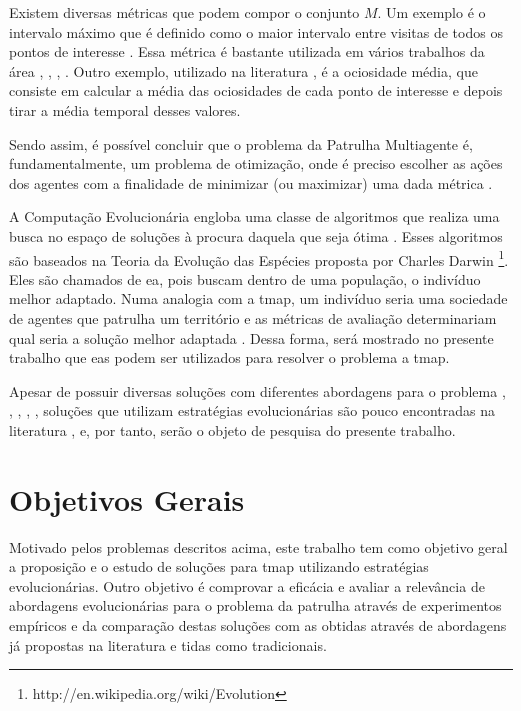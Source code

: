 Existem diversas métricas que podem compor o conjunto $M$. Um exemplo é o 
intervalo máximo que é definido como o maior intervalo entre visitas de todos os 
pontos de interesse \citep{sampaiophd}. Essa métrica é bastante utilizada em 
vários trabalhos da área \citep{6900280}, \cite{Pippin:2013:PBT:2480362.2480378}, 
\citep{Chevaleyre:2004:TAM:1018411.1019013}, \citep{6615158}. Outro exemplo, 
utilizado na literatura \citep{hernandez2013game}, é a ociosidade média, que 
consiste em calcular a média das ociosidades de cada ponto de interesse e depois 
tirar a média temporal desses valores.

Sendo assim, é possível concluir que o problema da Patrulha Multiagente é, 
fundamentalmente, um problema de otimização, onde é preciso escolher as ações 
dos agentes com a finalidade de minimizar (ou maximizar) uma dada métrica 
\citep{sampaiophd}.

A Computação Evolucionária engloba uma classe de algoritmos que realiza uma 
busca no espaço de soluções à procura daquela que seja ótima 
\citep{Luke2013Metaheuristics}. Esses algoritmos são baseados na Teoria da 
Evolução das Espécies proposta por Charles Darwin 
\footnote{http://en.wikipedia.org/wiki/Evolution}. Eles são chamados de \ac{ea}, 
pois buscam dentro de uma população, o indivíduo melhor adaptado. Numa analogia 
com a \ac{tmap}, um indivíduo seria uma sociedade de agentes que patrulha um 
território e as métricas de avaliação determinariam qual seria a solução melhor 
adaptada . Dessa forma, será mostrado no presente trabalho que \acp{ea} podem 
ser utilizados para resolver o problema a \ac{tmap}.

Apesar de possuir diversas soluções com diferentes abordagens para o problema 
\citep{Chevaleyre:2004:TAM:1018411.1019013}, 
\citep{Machado:2002:MPE:1765317.1765332}, \citep{Almeida:2004:AAI}, 
\citep{4209122}, \citep{hernandez2013game}, soluções que utilizam estratégias 
evolucionárias \citep{Luke2013Metaheuristics} são pouco encontradas na 
literatura \citep{4630897}, \citep{6900280} e, por tanto, serão o objeto de 
pesquisa do presente trabalho.

\section{Objetivos Gerais}

Motivado pelos problemas descritos acima, este trabalho tem como objetivo geral 
a proposição e o estudo de soluções para \ac{tmap} utilizando estratégias 
evolucionárias. Outro objetivo é comprovar a eficácia e avaliar a relevância de 
abordagens evolucionárias para o problema da patrulha através de experimentos 
empíricos e da comparação destas soluções com as obtidas através de abordagens 
já propostas na literatura e tidas como tradicionais.

